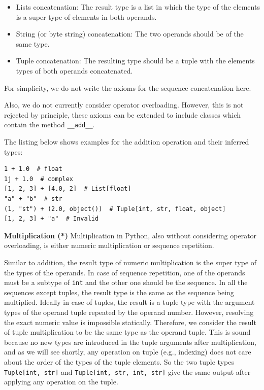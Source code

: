 \begin{itemize}
	\item Lists concatenation: The result type is a list in which the type of the elements is a super type of elements in both operands.
	\item String (or byte string) concatenation: The two operands should be of the same type.
	\item Tuple concatenation: The resulting type should be a tuple with the elements types of both operands concatenated.
\end{itemize}

For simplicity, we do not write the axioms for the sequence concatenation here.

Also, we do not currently consider operator overloading. However, this is not rejected by principle, these axioms can be extended to include classes which contain the method \lstinline|__add__|.

The listing below shows examples for the addition operation and their inferred types:

\begin{lstlisting}
1 + 1.0  # float
1j + 1.0  # complex
[1, 2, 3] + [4.0, 2]  # List[float]
"a" + "b"  # str
(1, "st") + (2.0, object())  # Tuple[int, str, float, object]
[1, 2, 3] + "a"  # Invalid
\end{lstlisting}

\textbf{Multiplication (*)}
Multiplication in Python, also without considering operator overloading, is either numeric multiplication or sequence repetition.

Similar to addition, the result type of numeric multiplication is the super type of the types of the operands. In case of sequence repetition, one of the operands must be a subtype of \lstinline|int| and the other one should be the sequence. In all the sequences except tuples, the result type is the same as the sequence being multiplied. Ideally in case of tuples, the result is a tuple type with the argument types of the operand tuple repeated by the operand number. However, resolving the exact numeric value is impossible statically. Therefore, we consider the result of tuple multiplication to be the same type as the operand tuple. This is sound because no new types are introduced in the tuple arguments after multiplication, and as we will see shortly, any operation on tuple (e.g., indexing) does not care about the order of the types of the tuple elements. So the two tuple types \lstinline|Tuple[int, str]| and \lstinline|Tuple[int, str, int, str]| give the same output after applying any operation on the tuple.\\

